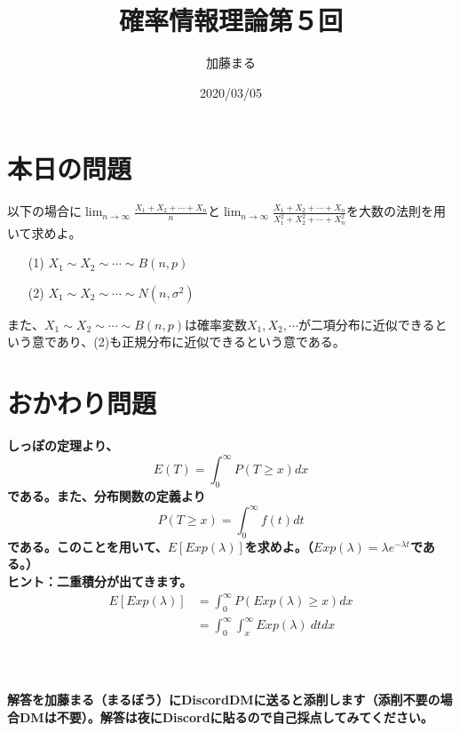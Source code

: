 \documentclass[a4j,uplatex]{jsarticle}
\title{確率情報理論第５回}
\author{加藤まる}
\date{2020/03/05}
\begin{document}
\maketitle

\section*{本日の問題}
以下の場合に$\displaystyle \lim_{n \to \infty} \frac{X_1 + X_2 + \cdots +X_n}{n}$と$\displaystyle \lim_{n \to \infty} \frac{X_1 + X_2 + \cdots +X_n}{X_1^2 + X_2^2 + \cdots +X_n^2}$を大数の法則を用いて求めよ。
\begin{itemize}
  \item[(1)] $X_1\sim X_2\sim \cdots \sim B(n,p)$
  \item[(2)] $X_1\sim X_2\sim \cdots \sim N(n,\sigma ^2)$
\end{itemize}
また、$X_1\sim X_2\sim \cdots \sim B(n,p)$は確率変数$X_1, X_2,\cdots$が二項分布に近似できるという意であり、(2)も正規分布に近似できるという意である。


\section*{おかわり問題}
\bf しっぽの定理\rm より、
\begin{equation}
  E(T)=\int_{0}^{\infty} P(T\ge x)dx
\end{equation}
である。また、分布関数の定義より
\begin{equation}
  P(T\ge x) = \int_{0}^{\infty} f(t)dt
\end{equation}
である。このことを用いて、$E[Exp(\lambda)]$を求めよ。（$Exp(\lambda)=\lambda e^{-\lambda t}$である。）
\\
ヒント：二重積分が出てきます。
\begin{equation}
  \begin{split}
    E[Exp(\lambda)] &= \int_{0}^{\infty} P(Exp(\lambda)\ge x)dx \\
    &=\int_{0}^{\infty} \int_{x}^{\infty} Exp(\lambda)~ dt dx
  \end{split}
\end{equation}
\\
\\
\\
解答を加藤まる（まるぼう）にDiscordDMに送ると添削します（添削不要の場合DMは不要）。解答は夜にDiscordに貼るので自己採点してみてください。
\end{document}
